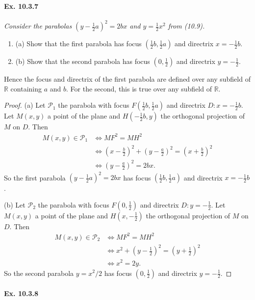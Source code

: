 \documentclass[11pt,a4paper]{article}
\newcommand{\be} {\begin{enumerate}}
\newcommand{\ee} {\end{enumerate}}
\newcommand{\R}{\mathbb{R}}
\begin{document}
\paragraph{Ex. 10.3.7}

{\it Consider the parabolas $\left (y-\frac{1}{2}a\right)^2 = 2bx$ and $y = \frac{1}{2} x^2$ from (10.9).
\be
\item[(a)] Show that the first parabola has focus $\left(\frac{1}{2}b,\frac{1}{2}a\right)$ and directrix $x=-\frac{1}{2} b$.
\item[(b)] Show that the second parabola has focus $\left(0,\frac{1}{2}\right)$ and directrix $y=-\frac{1}{2}$.
\ee
Hence the focus and directrix of the first parabola are defined over any subfield of $\R$ containing $a$ and $b$. For the second, this is true over any subfield of $\R$.
}

\begin{proof}
\item[(a)]
Let ${\mathscr P} _1$ the parabola with focus $F\left(\frac{1}{2}b,\frac{1}{2}a\right)$ and directrix $D : x=-\frac{1}{2} b$. Let $M(x,y)$ a point of the plane and $H(-\frac{1}{2}b,y)$ the orthogonal projection of $M$ on $D$. Then
\begin{align*}
M(x,y) \in {\mathscr P} _1 &\iff MF^2 = MH^2\\
& \iff \left(x-\frac{b}{2}\right)^2 + \left ( y -\frac{a}{2} \right)^2 = \left(x+\frac{b}{2}\right)^2\\
&\iff  \left ( y -\frac{a}{2} \right)^2 = 2bx.
\end{align*}
So the first parabola $\left (y-\frac{1}{2}a\right)^2 = 2bx$ has focus $\left(\frac{1}{2}b,\frac{1}{2}a\right)$ and directrix $x=-\frac{1}{2} b$.

\item[(b)] Let ${\mathscr P} _2$ the parabola with focus $F\left(0,\frac{1}{2}\right)$ and directrix $D : y=-\frac{1}{2} $. Let $M(x,y)$ a point of the plane and $H(x,-\frac{1}{2})$ the orthogonal projection of $M$ on $D$. Then
\begin{align*}
M(x,y) \in {\mathscr P} _2 &\iff MF^2 = MH^2\\
& \iff x^2 + \left ( y -\frac{1}{2} \right)^2 = \left(y+\frac{1}{2}\right)^2\\
&\iff x^2 = 2y.
\end{align*}
So the second parabola $y = x^2/2$ has focus $\left(0,\frac{1}{2}\right)$ and directrix $y=-\frac{1}{2}$.
\end{proof}

\paragraph{Ex. 10.3.8}
\end{document}

